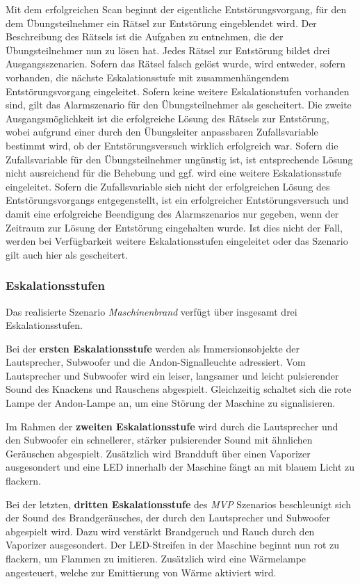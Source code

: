 Mit dem erfolgreichen Scan beginnt der eigentliche Entstörungsvorgang, für den dem Übungsteilnehmer ein Rätsel zur Entstörung eingeblendet wird. Der Beschreibung des Rätsels ist die Aufgaben zu entnehmen, die der Übungsteilnehmer nun zu lösen hat. Jedes Rätsel zur Entstörung bildet drei Ausgangsszenarien. Sofern das Rätsel falsch gelöst wurde, wird entweder, sofern vorhanden, die nächste Eskalationsstufe mit zusammenhängendem Entstörungsvorgang eingeleitet. Sofern keine weitere Eskalationstufen vorhanden sind, gilt das Alarmszenario für den Übungsteilnehmer als gescheitert. Die zweite Ausgangsmöglichkeit ist die erfolgreiche Lösung des Rätsels zur Entstörung, wobei aufgrund einer durch den Übungsleiter anpassbaren Zufallsvariable bestimmt wird, ob der Entstörungsversuch wirklich erfolgreich war. Sofern die Zufallsvariable für den Übungsteilnehmer ungünstig ist, ist entsprechende Lösung nicht ausreichend für die Behebung und ggf. wird eine weitere Eskalationsstufe eingeleitet. Sofern die Zufallsvariable sich nicht der erfolgreichen Lösung des Entstörungsvorgangs entgegenstellt, ist ein erfolgreicher Entstörungsversuch und damit eine erfolgreiche Beendigung des Alarmszenarios nur gegeben, wenn der Zeitraum zur Lösung der Entstörung eingehalten wurde. Ist dies nicht der Fall, werden bei Verfügbarkeit weitere Eskalationsstufen eingeleitet oder das Szenario gilt auch hier als gescheitert.  

\subsubsection{Eskalationsstufen}

Das realisierte Szenario \textit{Maschinenbrand} verfügt über insgesamt drei Eskalationsstufen.

Bei der \textbf{ersten Eskalationsstufe} werden als Immersionsobjekte der Lautsprecher, Subwoofer und die Andon-Signalleuchte adressiert. Vom Lautsprecher und Subwoofer wird ein leiser, langsamer und leicht pulsierender Sound des Knackens und Rauschens abgespielt. Gleichzeitig schaltet sich die rote Lampe der Andon-Lampe an, um eine Störung der Maschine zu signalisieren.

Im Rahmen der \textbf{zweiten Eskalationsstufe} wird durch die Lautsprecher und den Subwoofer ein schnellerer, stärker pulsierender Sound mit ähnlichen Geräuschen abgespielt. Zusätzlich wird Brandduft über einen Vaporizer ausgesondert und eine LED innerhalb der Maschine fängt an mit blauem Licht zu flackern. 

Bei der letzten, \textbf{dritten Eskalationsstufe} des \textit{MVP} Szenarios beschleunigt sich der Sound des Brandgeräusches, der durch den Lautsprecher und Subwoofer abgespielt wird. Dazu wird verstärkt Brandgeruch und Rauch durch den Vaporizer ausgesondert. Der LED-Streifen in der Maschine beginnt nun rot zu flackern, um Flammen zu imitieren. Zusätzlich wird eine Wärmelampe angesteuert, welche zur Emittierung von Wärme aktiviert wird.

